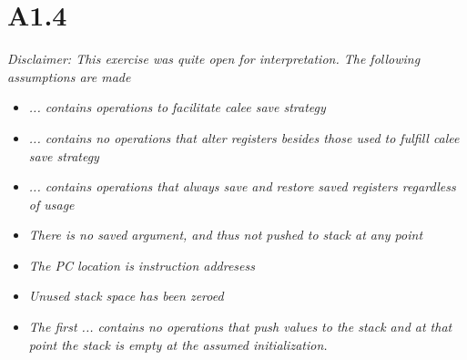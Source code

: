 \section*{A1.4}
\textit{Disclaimer: This exercise was quite open for interpretation. The following assumptions are made}
\begin{itemize}
    \item \textit{... contains operations to facilitate calee save strategy}
    \item \textit{... contains no operations that alter registers besides those used to fulfill calee save strategy}
    \item \textit{... contains operations that always save and restore saved registers regardless of usage}
    \item \textit{There is no saved argument, and thus not pushed to stack at any point}
    \item \textit{The PC location is instruction addresess}
    \item \textit{Unused stack space has been zeroed}
    \item \textit{The first ... contains no operations that push values to the stack and at that point the stack is empty at the assumed initialization.}
\end{itemize}


